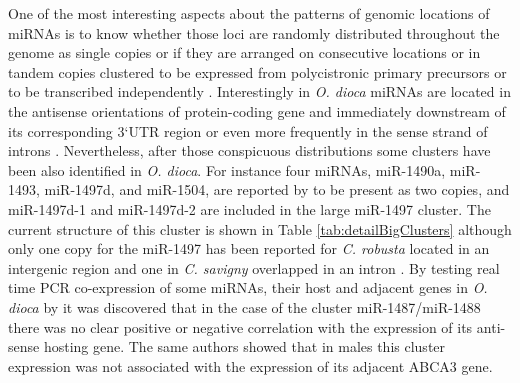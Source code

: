 \documentclass[graybox]{svmult}
\begin{document}
One of the most interesting aspects about the patterns of genomic locations
of miRNAs is to know whether those loci are randomly distributed
throughout the genome as single copies or if they are arranged on
consecutive locations or in tandem copies clustered to be expressed from
polycistronic primary precursors or to be transcribed independently
\cite{Tanzer:10a}. Interestingly in \textit{O. dioca} miRNAs are located in
the antisense orientations of protein-coding gene and immediately
downstream of its corresponding 3`UTR region or even more frequently in the 
sense strand of introns \cite{Fu:08}. Nevertheless, after those conspicuous
distributions some clusters have been also identified in
\textit{O. dioca}. For instance four miRNAs, miR-1490a, miR-1493,
miR-1497d, and miR-1504, are reported by \cite{Fu:08} to be present as
two copies, and miR-1497d-1 and miR-1497d-2 are included in the large
miR-1497 cluster. The current structure of this cluster is shown in Table
\ref{tab:detailBigClusters} although only one copy for the miR-1497 has
been reported for \textit{C. robusta} located in an intergenic region
\cite{Fu:08, Hendrix2010} and one in \textit{C. savigny} overlapped in an
intron \cite{Fu:08}. By testing real time PCR co-expression of some miRNAs,
their host and adjacent genes in \textit{O.  dioca} by \cite{Fu:08} it was
discovered that in the case of the cluster miR-1487/miR-1488 there was no clear 
positive or negative correlation with the expression of its anti-sense
hosting gene. The same authors showed that in males this cluster expression 
was not associated with the expression of its adjacent ABCA3 gene.
\end{document}
